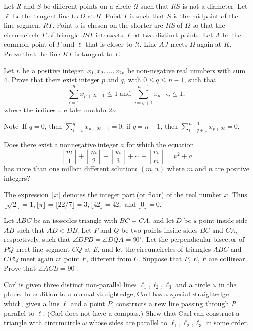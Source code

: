 \documentclass[11pt]{scrartcl}
\begin{document}
\begin{problem}[6269154814902278202]
	Let $R$ and $S$ be different points on a circle $\Omega$ such that $RS$ is not a diameter. Let $\ell$ be the tangent line to $\Omega$ at $R$. Point $T$ is such that $S$ is the midpoint of the line segment $RT$. Point $J$ is chosen on the shorter arc $RS$ of $\Omega$ so that the circumcircle $\Gamma$ of triangle $JST$ intersects $\ell$ at two distinct points. Let $A$ be the common point of $\Gamma$ and $\ell$ that is closer to $R$. Line $AJ$ meets $\Omega$ again at $K$. Prove that the line $KT$ is tangent to $\Gamma$.
\end{problem}
\begin{problem}[6286695814802393070]
Let $n$ be a positive integer, $x_1,x_2,\ldots,x_{2n}$ be non-negative real numbers with sum $4$. Prove that there exist integer $p$ and $q$, with $0 \le q \le n-1$, such that
\[ \sum_{i=1}^q x_{p+2i-1} \le 1 \mbox{ and } \sum_{i=q+1}^{n-1} x_{p+2i} \le 1,  \]where the indices are take modulo $2n$.

Note: If $q=0$, then $\sum_{i=1}^q x_{p+2i-1}=0$; if $q=n-1$, then $\sum_{i=q+1}^{n-1} x_{p+2i}=0$.
\end{problem}
\begin{problem}[6287115858827066074]
Does there exist a nonnegative integer $a$ for which the equation
\[\left\lfloor\frac{m}{1}\right\rfloor + \left\lfloor\frac{m}{2}\right\rfloor + \left\lfloor\frac{m}{3}\right\rfloor + \cdots + \left\lfloor\frac{m}{m}\right\rfloor = n^2 + a\]has more than one million different solutions $(m, n)$ where $m$ and $n$ are positive integers?

The expression $\lfloor x\rfloor$ denotes the integer part (or floor) of the real number $x$. Thus $\lfloor\sqrt{2}\rfloor = 1, \lfloor\pi\rfloor =\lfloor 22/7 \rfloor = 3, \lfloor 42\rfloor = 42,$ and $\lfloor 0 \rfloor = 0$.
\end{problem}
\begin{problem}[6302540840099076878]
Let $ABC$ be an isosceles triangle with $BC=CA$, and let $D$ be a point inside side $AB$ such that $AD< DB$. Let $P$ and $Q$ be two points inside sides $BC$ and $CA$, respectively, such that $\angle DPB = \angle DQA = 90^{\circ}$. Let the perpendicular bisector of $PQ$ meet line segment $CQ$ at $E$, and let the circumcircles of triangles $ABC$ and $CPQ$ meet again at point $F$, different from $C$.
Suppose that $P$, $E$, $F$ are collinear. Prove that $\angle ACB = 90^{\circ}$.
\end{problem}
\begin{problem}[6306108494297192985]
Carl is given three distinct non-parallel lines $\ell_1, \ell_2, \ell_3$ and a circle $\omega$ in the plane. In addition to a normal straightedge, Carl has a special straightedge which, given a line $\ell$ and a point $P$, constructs a new line passing through $P$ parallel to $\ell$. (Carl does not have a compass.) Show that Carl can construct a triangle with circumcircle $\omega$ whose sides are parallel to $\ell_1,\ell_2,\ell_3$ in some order.
\end{problem}
\end{document}
